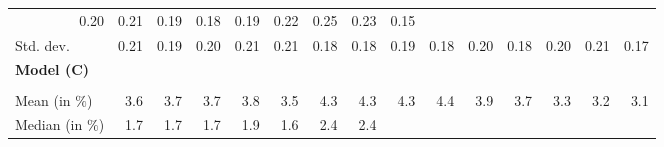 \begin{tabular}{lllllllllllllll}
  \multicolumn{1}{r}{0.20} &
  \multicolumn{1}{r}{0.21} &
  \multicolumn{1}{r}{0.19} &
  \multicolumn{1}{r}{0.18} &
  \multicolumn{1}{r}{0.19} &
  \multicolumn{1}{r}{0.22} &
  \multicolumn{1}{r}{0.25} &
  \multicolumn{1}{r}{0.23} &
  \multicolumn{1}{r}{0.15} \\
\multicolumn{1}{l}{\hspace{2em}Std. dev.} &
  \multicolumn{1}{|r}{0.21} &
  \multicolumn{1}{r}{0.19} &
  \multicolumn{1}{r}{0.20} &
  \multicolumn{1}{r}{0.21} &
  \multicolumn{1}{r}{0.21} &
  \multicolumn{1}{r}{0.18} &
  \multicolumn{1}{r}{0.18} &
  \multicolumn{1}{r}{0.19} &
  \multicolumn{1}{r}{0.18} &
  \multicolumn{1}{r}{0.20} &
  \multicolumn{1}{r}{0.18} &
  \multicolumn{1}{r}{0.20} &
  \multicolumn{1}{r}{0.21} &
  \multicolumn{1}{r}{0.17} \\ \hline
\multicolumn{1}{l}{{\textbf{Model (C)}}} &
  \multicolumn{1}{|r}{} &
  \multicolumn{1}{r}{} &
  \multicolumn{1}{r}{} &
  \multicolumn{1}{r}{} &
  \multicolumn{1}{r}{} &
  \multicolumn{1}{r}{} &
  \multicolumn{1}{r}{} &
  \multicolumn{1}{r}{} &
  \multicolumn{1}{r}{} &
  \multicolumn{1}{r}{} &
  \multicolumn{1}{r}{} &
  \multicolumn{1}{r}{} &
  \multicolumn{1}{r}{} &
  \multicolumn{1}{r}{} \\ \hline
\multicolumn{1}{l}{\hspace{1em}{\textit{Additive term} ($\widehat{t}^{add}/\widetilde{p}$)}} &
  \multicolumn{1}{|r}{} &
  \multicolumn{1}{r}{} &
  \multicolumn{1}{r}{} &
  \multicolumn{1}{r}{} &
  \multicolumn{1}{r}{} &
  \multicolumn{1}{r}{} &
  \multicolumn{1}{r}{} &
  \multicolumn{1}{r}{} &
  \multicolumn{1}{r}{} &
  \multicolumn{1}{r}{} &
  \multicolumn{1}{r}{} &
  \multicolumn{1}{r}{} &
  \multicolumn{1}{r}{} &
  \multicolumn{1}{r}{} \\
\multicolumn{1}{l}{\hspace{2em}Mean (in $\%$)} &
  \multicolumn{1}{|r}{3.6} &
  \multicolumn{1}{r}{3.7} &
  \multicolumn{1}{r}{3.7} &
  \multicolumn{1}{r}{3.8} &
  \multicolumn{1}{r}{3.5} &
  \multicolumn{1}{r}{4.3} &
  \multicolumn{1}{r}{4.3} &
  \multicolumn{1}{r}{4.3} &
  \multicolumn{1}{r}{4.4} &
  \multicolumn{1}{r}{3.9} &
  \multicolumn{1}{r}{3.7} &
  \multicolumn{1}{r}{3.3} &
  \multicolumn{1}{r}{3.2} &
  \multicolumn{1}{r}{3.1} \\
\multicolumn{1}{l}{\hspace{2em}Median (in $\%$)} &
  \multicolumn{1}{|r}{1.7} &
  \multicolumn{1}{r}{1.7} &
  \multicolumn{1}{r}{1.7} &
  \multicolumn{1}{r}{1.9} &
  \multicolumn{1}{r}{1.6} &
  \multicolumn{1}{r}{2.4} &
  \multicolumn{1}{r}{2.4} &

\end{tabular}
